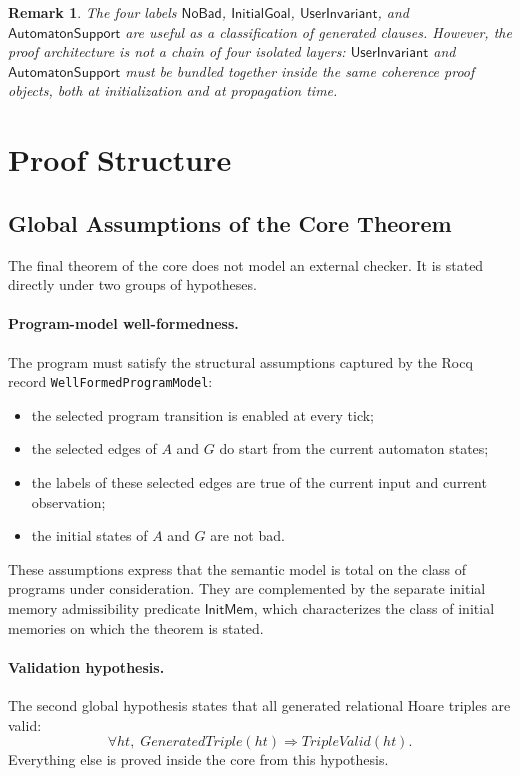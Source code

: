 \documentclass[11pt,a4paper]{article}
\newtheorem{remark}[definition]{Remark}
\begin{document}
\begin{remark}
The four labels
\(\mathsf{NoBad}\), \(\mathsf{InitialGoal}\), \(\mathsf{UserInvariant}\), and
\(\mathsf{AutomatonSupport}\) are useful as a classification of generated
clauses. However, the proof architecture is not a chain of four isolated
layers: \(\mathsf{UserInvariant}\) and \(\mathsf{AutomatonSupport}\) must be
bundled together inside the same coherence proof objects, both at initialization
and at propagation time.
\end{remark}

\section{Proof Structure}

\subsection{Global Assumptions of the Core Theorem}

The final theorem of the core does not model an external checker. It is stated
directly under two groups of hypotheses.

\paragraph{Program-model well-formedness.}
The program must satisfy the structural assumptions captured by the Rocq record
\texttt{WellFormedProgramModel}:
\begin{itemize}[leftmargin=1.4em]
\item the selected program transition is enabled at every tick;
\item the selected edges of \(A\) and \(G\) do start from the current automaton
  states;
\item the labels of these selected edges are true of the current input and
  current observation;
\item the initial states of \(A\) and \(G\) are not bad.
\end{itemize}
These assumptions express that the semantic model is total on the class of
programs under consideration. They are complemented by the separate initial
memory admissibility predicate \(\mathsf{InitMem}\), which characterizes the class of
initial memories on which the theorem is stated.

\paragraph{Validation hypothesis.}
The second global hypothesis states that all generated relational Hoare triples
are valid:
\[
\forall ht,\; GeneratedTriple(ht) \Rightarrow TripleValid(ht).
\]
Everything else is proved inside the core from this hypothesis.
\end{document}
